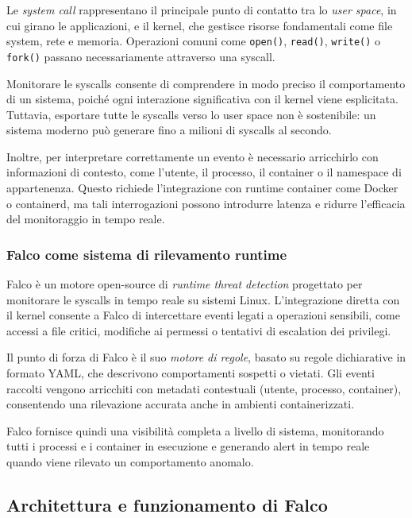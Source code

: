 Le \emph{system call} rappresentano il principale punto di contatto tra lo \emph{user space}, in cui girano le applicazioni, e il kernel, che gestisce risorse fondamentali come file system, rete e memoria. Operazioni comuni come \texttt{open()}, \texttt{read()}, \texttt{write()} o \texttt{fork()} passano necessariamente attraverso una syscall.

Monitorare le syscalls consente di comprendere in modo preciso il comportamento di un sistema, poiché ogni interazione significativa con il kernel viene esplicitata. Tuttavia, esportare tutte le syscalls verso lo user space non è sostenibile: un sistema moderno può generare fino a milioni di syscalls al secondo.

Inoltre, per interpretare correttamente un evento è necessario arricchirlo con informazioni di contesto, come l’utente, il processo, il container o il namespace di appartenenza. Questo richiede l’integrazione con runtime container come Docker o containerd, ma tali interrogazioni possono introdurre latenza e ridurre l’efficacia del monitoraggio in tempo reale.

\subsubsection{Falco come sistema di rilevamento runtime}

Falco è un motore open-source di \emph{runtime threat detection} progettato per monitorare le syscalls in tempo reale su sistemi Linux. L’integrazione diretta con il kernel consente a Falco di intercettare eventi legati a operazioni sensibili, come accessi a file critici, modifiche ai permessi o tentativi di escalation dei privilegi.

Il punto di forza di Falco è il suo \emph{motore di regole}, basato su regole dichiarative in formato YAML, che descrivono comportamenti sospetti o vietati. Gli eventi raccolti vengono arricchiti con metadati contestuali (utente, processo, container), consentendo una rilevazione accurata anche in ambienti containerizzati.

Falco fornisce quindi una visibilità completa a livello di sistema, monitorando tutti i processi e i container in esecuzione e generando alert in tempo reale quando viene rilevato un comportamento anomalo.

\subsection{Architettura e funzionamento di Falco}

